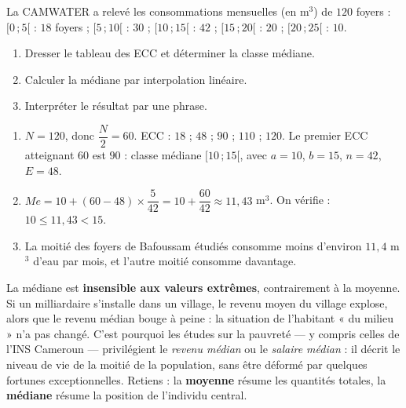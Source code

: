 \documentclass[11pt]{article}
\begin{document}
\begin{exercice}
La CAMWATER a relevé les consommations mensuelles (en m$^3$) de $120$ foyers : $[0\,;5[$ : $18$ foyers ; $[5\,;10[$ : $30$ ; $[10\,;15[$ : $42$ ; $[15\,;20[$ : $20$ ; $[20\,;25[$ : $10$.
\begin{enumerate}
\item Dresser le tableau des ECC et déterminer la classe médiane.
\item Calculer la médiane par interpolation linéaire.
\item Interpréter le résultat par une phrase.
\end{enumerate}
\end{exercice}

\begin{corrige}
\begin{enumerate}
\item $N = 120$, donc $\dfrac{N}{2} = 60$. ECC : $18$ ; $48$ ; $90$ ; $110$ ; $120$. Le premier ECC atteignant $60$ est $90$ : classe médiane $[10\,;15[$, avec $a = 10$, $b = 15$, $n = 42$, $E = 48$.
\item $Me = 10 + (60 - 48) \times \dfrac{5}{42} = 10 + \dfrac{60}{42} \approx 11{,}43$ m$^3$. On vérifie : $10 \leq 11{,}43 < 15$.
\item La moitié des foyers de Bafoussam étudiés consomme moins d'environ $11{,}4$ m$^3$ d'eau par mois, et l'autre moitié consomme davantage.
\end{enumerate}
\end{corrige}

\begin{savaistu}
La médiane est \textbf{insensible aux valeurs extrêmes}, contrairement à la moyenne. Si un milliardaire s'installe dans un village, le revenu moyen du village explose, alors que le revenu médian bouge à peine : la situation de l'habitant « du milieu » n'a pas changé. C'est pourquoi les études sur la pauvreté — y compris celles de l'INS Cameroun — privilégient le \emph{revenu médian} ou le \emph{salaire médian} : il décrit le niveau de vie de la moitié de la population, sans être déformé par quelques fortunes exceptionnelles. Retiens : la \textbf{moyenne} résume les quantités totales, la \textbf{médiane} résume la position de l'individu central.
\end{savaistu}
\end{document}
